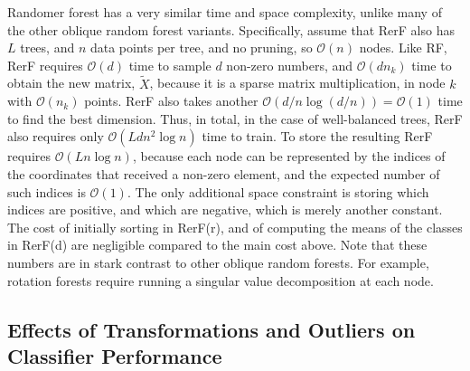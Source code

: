\documentclass{article} %
\providecommand{\mc}[1]{\mathcal{#1}}
\providecommand{\mt}[1]{\widetilde{#1}}
\begin{document}
Randomer forest has a very similar time and space complexity, unlike many of the other oblique random forest variants.  Specifically, assume that RerF also has $L$ trees, and $n$ data points per tree, and no pruning, so $\mc O(n)$ nodes. Like RF, RerF requires $\mc{O}(d)$ time to sample $d$ non-zero numbers, and $\mc{O}(dn_k)$ time to obtain the new matrix, $\mt{X}$, because it is a sparse matrix multiplication, in node $k$ with $\mc O(n_k)$ points.  RerF also takes another $\mc{O}(d/n\log(d/n))=\mc O(1)$ time to find the best dimension. Thus, in total, in the case of well-balanced trees, RerF also requires only $\mc{O}(Ldn^2\log n)$ time to train.  To store the resulting RerF  requires $\mc{O}(L n\log n )$, because each node can be represented by the indices of the coordinates that received a non-zero element, and the expected number of such indices is $\mc O(1)$.  The only additional space constraint is storing which indices are positive, and which are negative, which is merely another constant.
The cost of initially sorting in RerF(r), and of computing the means of the classes in RerF(d) are negligible compared to the main cost above. Note that these numbers are in stark contrast to other oblique random forests.  For example, rotation forests require running a singular value decomposition at each node.


\subsection{Effects of Transformations and Outliers on Classifier Performance}
\end{document}
